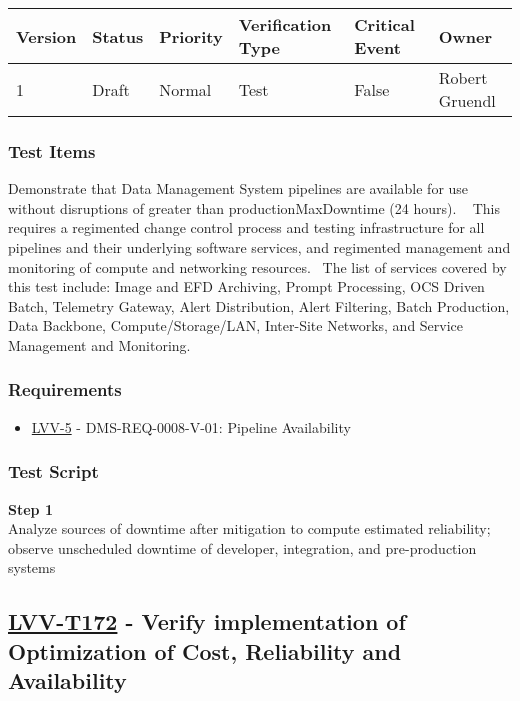 \begin{longtable}[]{@{}llllll@{}}
\toprule
Version & Status & Priority & Verification Type & Critical Event &
Owner\tabularnewline
\midrule
\endhead
1 & Draft & Normal & Test & False & Robert Gruendl\tabularnewline
\bottomrule
\end{longtable}

\subsubsection{Test Items}\label{test-items-35}

Demonstrate that Data Management System pipelines are available for use
without disruptions of greater than productionMaxDowntime (24 hours). ~
This requires a regimented change control process and testing
infrastructure for all pipelines and their underlying software services,
and regimented management and monitoring of compute and networking
resources. ~The list of services covered by this test include: Image and
EFD Archiving, Prompt Processing, OCS Driven Batch, Telemetry Gateway,
Alert Distribution, Alert Filtering, Batch Production, Data Backbone,
Compute/Storage/LAN, Inter-Site Networks, and Service Management and
Monitoring.

\subsubsection{Requirements}\label{requirements-35}

\begin{itemize}
\tightlist
\item
  \href{https://jira.lsstcorp.org/browse/LVV-5}{LVV-5} -
  DMS-REQ-0008-V-01: Pipeline Availability
\end{itemize}

\subsubsection{Test Script}\label{test-script-35}

\textbf{Step 1}\\
Analyze sources of downtime after mitigation to compute estimated
reliability; observe unscheduled downtime of developer, integration, and
pre-production systems\\[2\baselineskip]

\hypertarget{lvv-t172---verify-implementation-of-optimization-of-cost-reliability-and-availability}{\subsection{\texorpdfstring{\href{https://jira.lsstcorp.org/secure/Tests.jspa\#/testCase/LVV-T172}{LVV-T172}
- Verify implementation of Optimization of Cost, Reliability and
Availability}{LVV-T172 - Verify implementation of Optimization of Cost, Reliability and Availability}}\label{lvv-t172---verify-implementation-of-optimization-of-cost-reliability-and-availability}}

